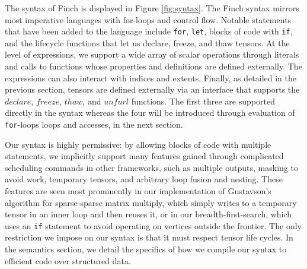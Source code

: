 The syntax of Finch is displayed in Figure \ref{fig:syntax}. The Finch syntax
mirrors most imperative languages with for-loops and control flow. Notable
statements that have been added to the language include \texttt{for},
\texttt{let}, blocks of code with \texttt{if}, and 
the lifecycle functions that let us declare, freeze, and thaw tensors.
%
At the level of expressions, we support a wide array of scalar operations through literals and calls to functions whose properties and definitions are defined externally.
%
The expressions can also interact with indices and extents.
Finally, as detailed in the previous section, tensors are defined externally via an interface that supports the $declare$, $freeze$, $thaw$, and $unfurl$ functions.
%
The first three are supported directly in the syntax whereas the four will be introduced through evaluation of \texttt{for}-loops loops and accesses,
in the next section.
%

Our syntax is highly permissive: by allowing blocks of code with multiple statements, we implicitly support many features gained through complicated scheduling commands in other frameworks, such as multiple outputs, masking to avoid work, temporary tensors, and arbitrary loop fusion and nesting.
%
These features are seen most prominently in our implementation of Gustavson's algorithm for sparse-sparse matrix multiply, which simply writes to a temporary tensor in an inner loop and then reuses it, or in our breadth-first-search, which uses an \texttt{if} statement to avoid operating on vertices outside the frontier. 
%
The only restriction we impose on our syntax is that it must respect tensor life cycles.
%
In the semantics section, we detail the specifics of how we compile our syntax to efficient code over structured data.



